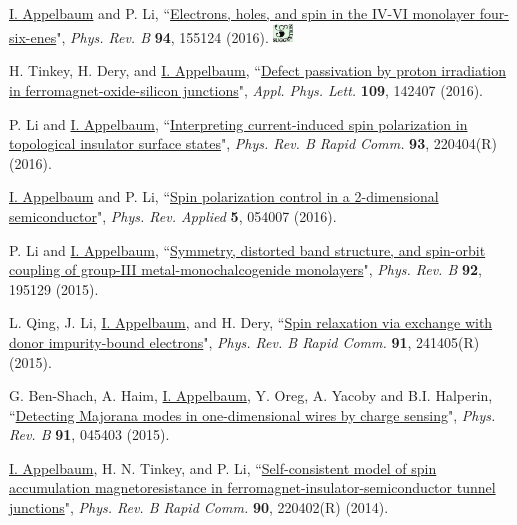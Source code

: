 \documentclass[paper=letter,fontsize=11pt]{scrartcl} %
\newcommand{\PaperEntry}[7]{
		\noindent #1, ``\href{#7}{#2}", \textit{#3} \textbf{#4}, #5 (#6).}
\begin{document}
\begin{etaremune}

\item \PaperEntry{\underline{I. Appelbaum} and P. Li}{Electrons, holes, and spin in the IV-VI monolayer four-six-enes}{Phys. Rev. B}{94}{155124}{2016}{http://link.aps.org/doi/10.1103/PhysRevB.94.155124} \includegraphics[width=0.2in]{sug.pdf} 

\item \PaperEntry{H. Tinkey, H. Dery, and \underline{I. Appelbaum}}{Defect passivation by proton irradiation in ferromagnet-oxide-silicon junctions}{Appl. Phys. Lett.}{109}{142407}{2016}{http://dx.doi.org/10.1063/1.4964344}
	
\item \PaperEntry{P. Li and \underline{I. Appelbaum}}{Interpreting current-induced spin polarization in topological insulator surface states}{Phys. Rev. B Rapid Comm.}{93}{220404(R)}{2016}{http://journals.aps.org/prb/abstract/10.1103/PhysRevB.93.220404}

\item \PaperEntry{\underline{I. Appelbaum} and P. Li}{Spin polarization control in a 2-dimensional semiconductor}{Phys. Rev. Applied}{5}{054007}{2016}{http://dx.doi.org/10.1103/PhysRevApplied.5.054007}

\item \PaperEntry{P. Li and \underline{I. Appelbaum}}{Symmetry, distorted band structure, and spin-orbit coupling of group-III metal-monochalcogenide monolayers}{Phys. Rev. B}{92}{195129}{2015}
{http://dx.doi.org/10.1103/PhysRevB.92.195129}

\item \PaperEntry{L. Qing, J. Li, \underline{I. Appelbaum}, and H. Dery}{Spin relaxation via exchange with donor impurity-bound electrons}{Phys. Rev. B Rapid Comm.}{91}{241405(R)}{2015}
{http://dx.doi.org/10.1103/PhysRevB.91.241405}

\item \PaperEntry{G. Ben-Shach, A. Haim, \underline{I. Appelbaum}, Y. Oreg, A. Yacoby and B.I. Halperin}{Detecting Majorana modes in one-dimensional wires by charge sensing}{Phys. Rev. B}{91}{045403}{2015}{http://dx.doi.org/10.1103/PhysRevB.91.045403}


\item \PaperEntry{\underline{I. Appelbaum}, H. N. Tinkey, and P. Li}{Self-consistent model of spin accumulation magnetoresistance in ferromagnet-insulator-semiconductor tunnel junctions}{Phys. Rev. B Rapid Comm.}{90}{220402(R)}{2014}
{http://dx.doi.org/10.1103/PhysRevB.90.220402}


\end{etaremune}
\end{document}
